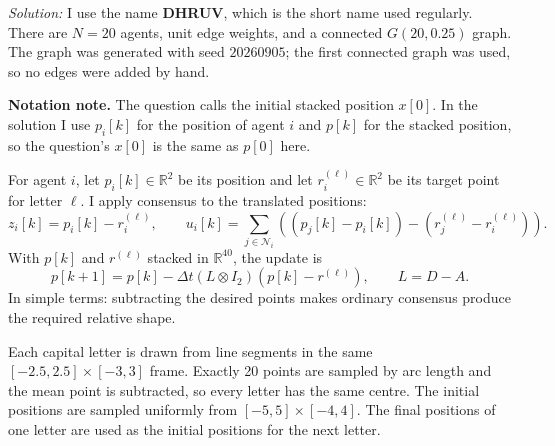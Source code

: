 \documentclass[a4paper,11pt]{article}
\newenvironment{solution}{\textit{Solution:}}{}
\newcommand{\R}{\mathbb{R}}
\begin{document}
\begin{solution}
I use the name \textbf{DHRUV}, which is the short name used regularly. There are $N=20$ agents,
unit edge weights, and a connected $G(20,0.25)$ graph. The graph was generated with seed
$20260905$; the first connected graph was used, so no edges were added by hand.

\textbf{Notation note.} The question calls the initial stacked position $x[0]$. In the solution I
use $p_i[k]$ for the position of agent $i$ and $p[k]$ for the stacked position, so the question's
$x[0]$ is the same as $p[0]$ here.

For agent $i$, let $p_i[k]\in\R^2$ be its position and let $r_i^{(\ell)}\in\R^2$ be its target
point for letter $\ell$. I apply consensus to the translated positions:
\[
z_i[k]=p_i[k]-r_i^{(\ell)},\qquad
u_i[k]=\sum_{j\in\mathcal N_i}\left((p_j[k]-p_i[k])-(r_j^{(\ell)}-r_i^{(\ell)})\right).
\]
With $p[k]$ and $r^{(\ell)}$ stacked in $\R^{40}$, the update is
\[
\boxed{p[k+1]=p[k]-\Delta t(L\otimes I_2)(p[k]-r^{(\ell)})},
\qquad L=D-A.
\]
In simple terms: subtracting the desired points makes ordinary consensus produce the required
relative shape.

Each capital letter is drawn from line segments in the same $[-2.5,2.5]\times[-3,3]$ frame.
Exactly 20 points are sampled by arc length and the mean point is subtracted, so every letter has
the same centre. The initial positions are sampled uniformly from $[-5,5]\times[-4,4]$. The final
positions of one letter are used as the initial positions for the next letter.


\end{solution}
\end{document}
